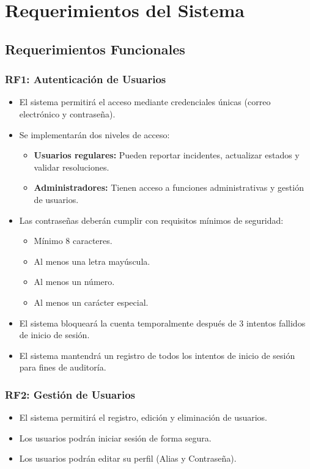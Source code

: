 \section{Requerimientos del Sistema}

\subsection{Requerimientos Funcionales}

\subsubsection{RF1: Autenticación de Usuarios}
\begin{itemize}
    \item El sistema permitirá el acceso mediante credenciales únicas (correo electrónico y contraseña).
    \item Se implementarán dos niveles de acceso:
    \begin{itemize}
        \item \textbf{Usuarios regulares:} Pueden reportar incidentes, actualizar estados y validar resoluciones.
        \item \textbf{Administradores:} Tienen acceso a funciones administrativas y gestión de usuarios.
    \end{itemize}
    \item Las contraseñas deberán cumplir con requisitos mínimos de seguridad:
    \begin{itemize}
        \item Mínimo 8 caracteres.
        \item Al menos una letra mayúscula.
        \item Al menos un número.
        \item Al menos un carácter especial.
    \end{itemize}
    \item El sistema bloqueará la cuenta temporalmente después de 3 intentos fallidos de inicio de sesión.
    \item El sistema mantendrá un registro de todos los intentos de inicio de sesión para fines de auditoría.
\end{itemize}

\subsubsection{RF2: Gestión de Usuarios}
\begin{itemize}
    \item El sistema permitirá el registro, edición y eliminación de usuarios.
    \item Los usuarios podrán iniciar sesión de forma segura.
    \item Los usuarios podrán editar su perfil (Alias y Contraseña).
\end{itemize}

